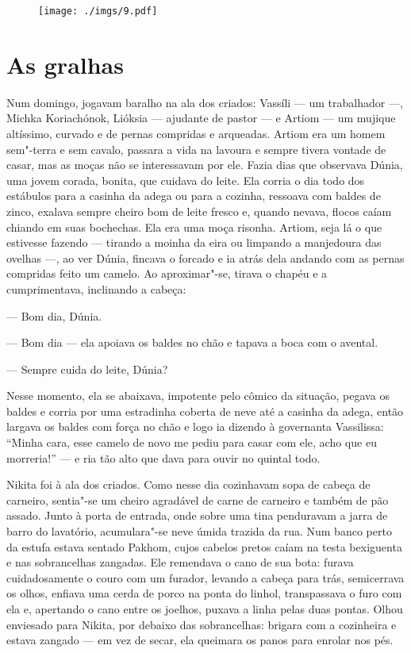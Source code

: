 \begin{figure}
\vspace*{-2.65cm}
\hspace*{-3.25cm}\texttt{[image: ./imgs/9.pdf]}
\end{figure}

\chapter{As gralhas}

Num domingo, jogavam baralho na ala dos criados: Vassíli --- um
trabalhador ---, Michka Koriachónok, Lióksia --- ajudante de pastor ---
e Artiom --- um mujique altíssimo, curvado e de pernas compridas e
arqueadas. Artiom era um homem sem"-terra e sem cavalo, passara a vida na
lavoura e sempre tivera vontade de casar, mas as moças não se
interessavam por ele. Fazia dias que observava Dúnia, uma jovem corada,
bonita, que cuidava do leite. Ela corria o dia todo dos estábulos para a
casinha da adega ou para a cozinha, ressoava com baldes de zinco,
exalava sempre cheiro bom de leite fresco e, quando nevava, flocos caíam
chiando em suas bochechas. Ela era uma moça risonha. Artiom, seja lá o
que estivesse fazendo --- tirando a moinha da eira ou limpando a
manjedoura das ovelhas ---, ao ver Dúnia, fincava o forcado e ia atrás
dela andando com as pernas compridas feito um camelo. Ao aproximar"-se,
tirava o chapéu e a cumprimentava, inclinando a cabeça:

--- Bom dia, Dúnia.

--- Bom dia --- ela apoiava os baldes no chão e tapava a boca com o
avental.

--- Sempre cuida do leite, Dúnia?

Nesse momento, ela se abaixava, impotente pelo cômico da situação,
pegava os baldes e corria por uma estradinha coberta de neve até a
casinha da adega, então largava os baldes com força no chão e logo ia
dizendo à governanta Vassilissa: ``Minha cara, esse camelo de novo me
pediu para casar com ele, acho que eu morreria!'' --- e ria tão alto que
dava para ouvir no quintal todo.

Nikita foi à ala dos criados. Como nesse dia cozinhavam sopa de cabeça
de carneiro, sentia"-se um cheiro agradável de carne de carneiro e também
de pão assado. Junto à porta de entrada, onde sobre uma tina penduravam
a jarra de barro do lavatório, acumulara"-se neve úmida trazida
da rua. Num banco perto da estufa estava sentado Pakhom, cujos cabelos
pretos caíam na testa bexiguenta e nas sobrancelhas zangadas. Ele
remendava o cano de sua bota: furava cuidadosamente o couro com um
furador, levando a cabeça para trás, semicerrava os olhos, enfiava uma
cerda de porco na ponta do linhol, transpassava o furo com ela e,
apertando o cano entre os joelhos, puxava a linha pelas duas pontas.
Olhou enviesado para Nikita, por debaixo das sobrancelhas: brigara com a
cozinheira e estava zangado --- em vez de secar, ela queimara os panos
para enrolar nos pés.

